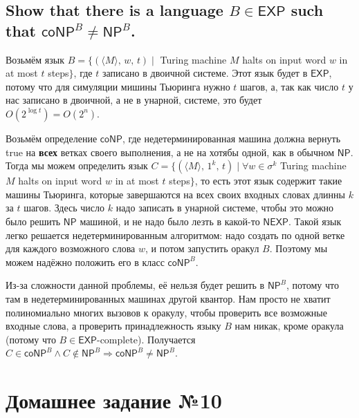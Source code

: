 \documentclass{article}
\newcommand{\NP}{\ensuremath{\mathsf{NP}}}
\newcommand{\coNP}{\ensuremath{\mathsf{coNP}}}
\newcommand{\EXP}{\ensuremath{\mathsf{EXP}}}
\begin{document}
  \subsection{Show that there is a language $B \in \EXP$ such that $\coNP^B \neq \NP^B$.}
  Возьмём язык $B = \{(\langle M \rangle,\, w,\, t) \mid$ Turing machine $M$ halts on input word $w$ in at most $t$ steps$\}$,
  где $t$ записано в двоичной системе.
  Этот язык будет в \EXP, потому что для симуляции мишины Тьюринга нужно $t$ шагов, а, так как число $t$ у нас записано в двоичной, а не в унарной, системе, это будет $O(2^{\log t}) = O(2^n)$.

  Возьмём определение \coNP, где недетерминированная машина должна вернуть true на \textbf{всех} ветках своего выполнения, а не на хотябы одной, как в обычном \NP.
  Тогда мы можем определить язык $C = \{(\langle M \rangle,\, 1^k,\, t) \mid \forall w \in \sigma^k$ Turing machine $M$ halts on input word $w$ in at most $t$ steps$\}$, то есть этот язык содержит такие машины Тьюринга, которые завершаются на всех своих входных словах длинны $k$ за $t$ шагов.
  Здесь число $k$ надо записать в унарной системе, чтобы это можно было решить \NP{} машиной, и не надо было лезть в какой-то $\mathsf{NEXP}$.
  Такой язык легко решается недетерминированным алгоритмом: надо создать по одной ветке для каждого возможного слова $w$, и потом запустить оракул $B$.
  Поэтому мы можем надёжно положить его в класс $\coNP^B$.

  Из-за сложности данной проблемы, её нельзя будет решить в $\NP^B$, потому что там в недетерминированных машинах другой квантор.
  Нам просто не хватит полиномиально многих вызовов к оракулу, чтобы проверить все возможные входные слова, а проверить принадлежность языку $B$ нам никак, кроме оракула (потому что $B \in \EXP\textrm{-complete}$).
  Получается $C \in \coNP^B \land C \not\in \NP^B \Longrightarrow \coNP^B \neq \NP^B$.

  \section{Домашнее задание №10}
  \setcounter{subsection}{8}
\end{document}
